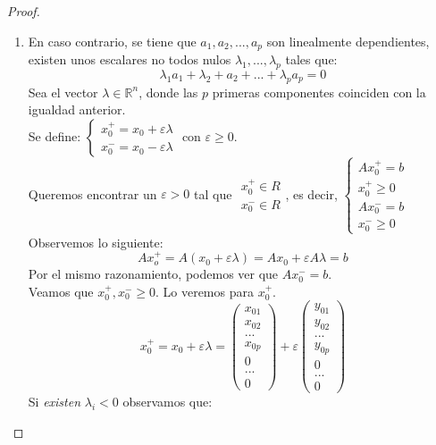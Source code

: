 \documentclass[11pt,fleqn]{book} %
\begin{document}
\begin{proof}
\begin{enumerate}
		\item En caso contrario, se tiene que $a_1, a_2, ..., a_p$ son linealmente dependientes, existen unos escalares no todos nulos $\lambda_1, ..., \lambda_p$ tales que:
		$$
			\lambda_1 a_1+\lambda_2+a_2+...+\lambda_p a_p=0
		$$
		Sea el vector $\lambda \in \mathbb{R}^n$, donde las $p$ primeras componentes coinciden con la igualdad anterior. \\
		Se define: $\left\{
		\begin{array}{c}
		x_0^+=x_0+\varepsilon \lambda \\
		x_0^-=x_0-\varepsilon \lambda
		\end{array}
		 \right.$ con $\varepsilon \geq 0$. \\
		 Queremos encontrar un $\varepsilon>0$ tal que $\begin{array}{c}
		 x_0^+ \in R \\
		 x_0^- \in R
		 \end{array}$, es decir, $\left\{
		 \begin{array}{c}
		 Ax_0^+=b \\x_0^+ \geq 0 \\ Ax_0^-=b \\ x_0^- \geq 0
		 \end{array}\right.$ \\
		 Observemos lo siguiente:
		 $$
			 Ax_o^+=A(x_0+\varepsilon \lambda)=Ax_0+ \varepsilon A \lambda = b
		 $$
		 Por el mismo razonamiento, podemos ver que $Ax_0^-=b$.  \\
		 Veamos que $x_0^+, x_0^- \geq 0$. Lo veremos para $x_0^+$.
		$$
				 x_0^+=x_0+\varepsilon \lambda=\left(\begin{array}{c}
				 x_{01} \\
				 x_{02} \\
				 ... \\
				 x_{0p} \\
				 0 \\
				 ... \\
				 0
				 \end{array}\right)+\varepsilon\left(\begin{array}{c}
				 y_{01} \\
				 y_{02} \\
				 ... \\
				 y_{0p} \\
				 0 \\
				 ... \\
				 0
				 \end{array}\right)
		$$
		 Si \textit{existen} $\lambda_i < 0$ observamos que:

\end{enumerate}
\end{proof}
\end{document}
